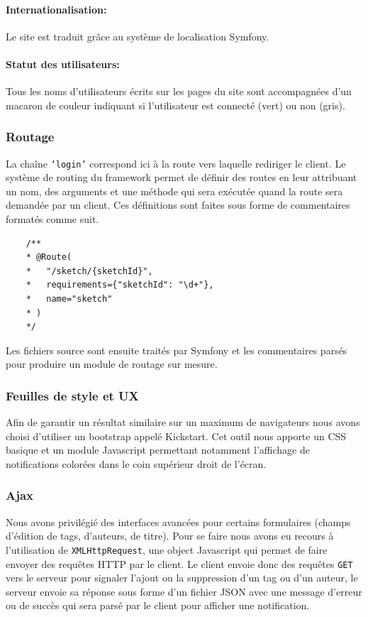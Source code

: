 \documentclass[a4paper]{article}
\begin{document}
\paragraph{Internationalisation: }Le site est traduit grâce au système de localisation Symfony.
\paragraph{Statut des utilisateurs: }Tous les noms d'utilisateurs écrits sur les pages du site sont accompagnées d'un macaron de couleur indiquant si l'utilisateur est connecté (vert) ou non (gris).


\subsubsection{Routage}
La chaîne \texttt{'login'} correspond ici à la route vers laquelle rediriger le client. Le système de routing du framework permet de définir des routes en leur attribuant un nom, des arguments et une méthode qui sera exécutée quand la route sera demandée par un client. Ces définitions sont faites sous forme de commentaires formatés comme suit.
\begin{lstlisting}
	/**
	* @Route(
	*   "/sketch/{sketchId}",
	*   requirements={"sketchId": "\d+"},
	*   name="sketch"
	* )
	*/
\end{lstlisting}
Les fichiers source sont ensuite traités par Symfony et les commentaires parsés pour produire un module de routage sur mesure.

\subsubsection{Feuilles de style et UX}
Afin de garantir un résultat similaire sur un maximum de navigateurs nous avons choisi d'utiliser un bootstrap appelé Kickstart. Cet outil nous apporte un CSS basique et un module Javascript permettant notamment l'affichage de notifications colorées dans le coin supérieur droit de l'écran.

\subsubsection{Ajax}
Nous avons privilégié des interfaces avancées pour certains formulaires (champs d'édition de tags, d'auteurs, de titre). Pour se faire nous avons eu recours à l'utilisation de \texttt{XMLHttpRequest}, une object Javascript qui permet de faire envoyer des requêtes HTTP par le client. Le client envoie donc des requêtes \texttt{GET} vers le serveur pour signaler l'ajout ou la suppression d'un tag ou d'un auteur, le serveur envoie sa réponse sous forme d'un fichier JSON avec une message d'erreur ou de succès qui sera parsé par le client pour afficher une notification.
\end{document}
